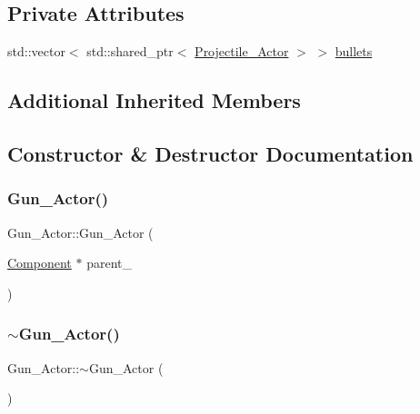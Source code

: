 \subsection*{Private Attributes}
\begin{DoxyCompactItemize}
\item 
std\+::vector$<$ std\+::shared\+\_\+ptr$<$ \hyperlink{classProjectile__Actor}{Projectile\+\_\+\+Actor} $>$ $>$ \hyperlink{classGun__Actor_a86eb484d33540f3e62678672adf921df}{bullets}
\end{DoxyCompactItemize}
\subsection*{Additional Inherited Members}


\subsection{Constructor \& Destructor Documentation}
\mbox{\label{classGun__Actor_afd0e2b7b3e6aa2606a7c82b093ba61ec}} 
\subsubsection{\texorpdfstring{Gun\+\_\+\+Actor()}{Gun\_Actor()}}
{\footnotesize\ttfamily Gun\+\_\+\+Actor\+::\+Gun\+\_\+\+Actor (\begin{DoxyParamCaption}\item[{\hyperlink{classComponent}{Component} $\ast$}]{parent\+\_\+ }\end{DoxyParamCaption})}

\mbox{\label{classGun__Actor_a571f2e9d82ff8de46951bfc4eda8a21a}} 
\subsubsection{\texorpdfstring{$\sim$\+Gun\+\_\+\+Actor()}{~Gun\_Actor()}}
{\footnotesize\ttfamily Gun\+\_\+\+Actor\+::$\sim$\+Gun\+\_\+\+Actor (\begin{DoxyParamCaption}{ }\end{DoxyParamCaption})}



